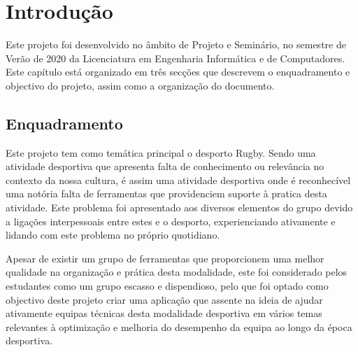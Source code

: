 %
%
\chapter{Introdução} \label{cap:intro}
	
Este projeto foi desenvolvido no âmbito de Projeto e Seminário, no semestre de Verão de 2020 da Licenciatura em Engenharia Informática e de Computadores. 
Este capítulo está organizado em três secções que descrevem o enquadramento e objectivo do projeto, assim como a organização do documento.


%
%
\section{Enquadramento\label{key}} \label{sec11}

%
Este projeto tem como temática principal o desporto Rugby. Sendo uma atividade desportiva que apresenta falta de conhecimento ou relevância no contexto da nossa cultura, é assim uma atividade desportiva onde é reconhecível uma notória falta de ferramentas que providenciem suporte à pratica desta atividade. Este problema foi apresentado aos diversos elementos do grupo devido a ligações interpessoais entre estes e o desporto, experienciando ativamente e lidando com este problema no próprio quotidiano.

Apesar de existir um grupo de ferramentas que proporcionem uma melhor qualidade na organização e prática desta modalidade, este foi considerado pelos estudantes como um grupo escasso e dispendioso, pelo que foi optado como objectivo deste projeto criar uma aplicação que assente na ideia de ajudar ativamente equipas técnicas desta modalidade desportiva em vários temas relevantes à optimização e melhoria do desempenho da equipa ao longo da época desportiva.


